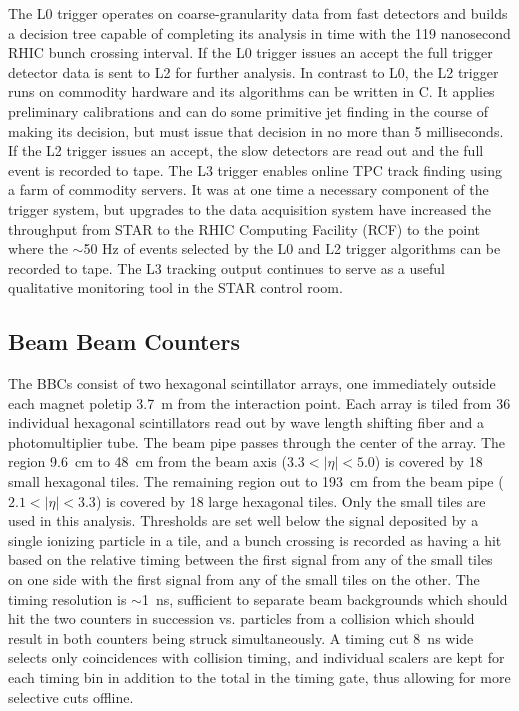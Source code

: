 The L0 trigger operates on coarse-granularity data from fast detectors and
builds a decision tree capable of completing its analysis in time with the 119
nanosecond RHIC bunch crossing interval. If the L0 trigger issues an accept
the full trigger detector data is sent to L2 for further analysis. In contrast
to L0, the L2 trigger runs on commodity hardware and its algorithms can be
written in C. It applies preliminary calibrations and can do some primitive
jet finding in the course of making its decision, but must issue that decision
in no more than 5 milliseconds. If the L2 trigger issues an accept, the slow
detectors are read out and the full event is recorded to tape. The L3 trigger
\cite{Adler:2002ab} enables online TPC track finding using a farm of commodity
servers. It was at one time a necessary component of the trigger system, but
upgrades to the data acquisition system have increased the throughput from
STAR to the RHIC Computing Facility (RCF) to the point where the $\sim$50 Hz
of events selected by the L0 and L2 trigger algorithms can be recorded to
tape. The L3 tracking output continues to serve as a useful qualitative
monitoring tool in the STAR control room.

\subsection{Beam Beam Counters\label{sec:bbc}}

The BBCs \cite{Kiryluk:2003aw} consist of two hexagonal scintillator arrays,
one immediately outside each magnet poletip 3.7~m from the interaction point.
Each array is tiled from 36 individual hexagonal scintillators read out by
wave length shifting fiber and a photomultiplier tube. The beam pipe passes
through the center of the array. The region 9.6~cm to 48~cm from the beam axis
($3.3 < |\eta| < 5.0$) is covered by 18 small hexagonal tiles. The remaining
region out to 193~cm from the beam pipe ($2.1 < |\eta| < 3.3$) is covered by
18 large hexagonal tiles. Only the small tiles are used in this analysis.
Thresholds are set well below the signal deposited by a single ionizing
particle in a tile, and a bunch crossing is recorded as having a hit based on
the relative timing between the first signal from any of the small tiles on
one side with the first signal from any of the small tiles on the other. The
timing resolution is $\sim$1~ns, sufficient to separate beam backgrounds which
should hit the two counters in succession vs. particles from a collision which
should result in both counters being struck simultaneously. A timing cut 8~ns
wide selects only coincidences with collision timing, and individual scalers
are kept for each timing bin in addition to the total in the timing gate, thus
allowing for more selective cuts offline.

